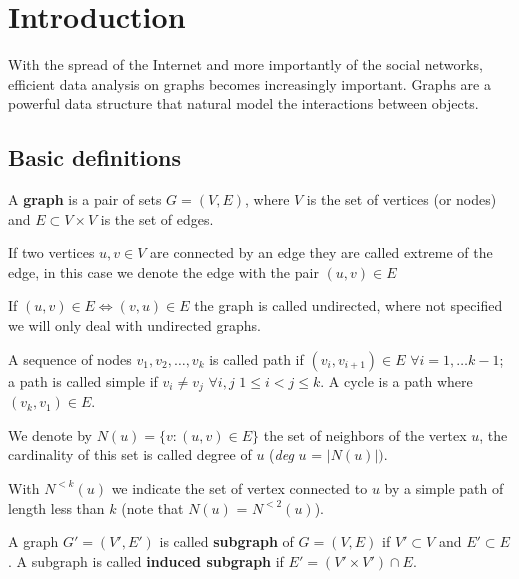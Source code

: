 
\chapter{Introduction}

With the spread of the Internet and more importantly of the social networks, efficient data analysis on graphs becomes increasingly important.
Graphs are a powerful data structure that natural model the interactions between objects.


\section{Basic definitions}

\begin{definizione}\label{def:graph}
    A \textbf{graph} is a pair of sets $G=(V,E)$, where $V$ is the set of vertices (or nodes) and $E \subset V \times V$ is the set of edges.
\end{definizione}

If two vertices $u, v \in V$ are connected by an edge they are called extreme of the edge, in this case we denote the edge with the pair $(u, v) \in E$

If $(u,v) \in E \Leftrightarrow (v,u) \in E$ the graph is called undirected, where not specified we will only deal with undirected graphs.

A sequence of nodes  $v_{1}, v_{2}, \ldots, v_{k}$ is called path if $(v_{i}, v_{i+1}) \in E$ $\forall i = 1, \ldots k-1$; a path is called simple if $v_{i} \neq v_{j}$ $\forall i,j$ $1 \leq i < j \leq k$. A cycle is a path where $(v_{k}, v_{1}) \in E$.

We denote by $N(u) = \{ v : (u,v) \in E \}$ the set of neighbors of the vertex $u$, the cardinality of this set is called degree of $u$ (\textit{deg} $u$ = $|N(u)|)$. 

With $N^{<k}(u)$ we indicate the set of vertex connected to $u$ by a simple path of length less than $k$ (note that $N(u)$ = $N^{<2}(u)$).

\begin{definizione}\label{def:subgraph}
    A graph $G' = (V', E')$ is called \textbf{subgraph} of $G=(V,E)$ if $V' \subset V$ and $E' \subset E$. A subgraph is called \textbf{induced subgraph} if $E' = (V' \times V') \cap E$.
\end{definizione}

